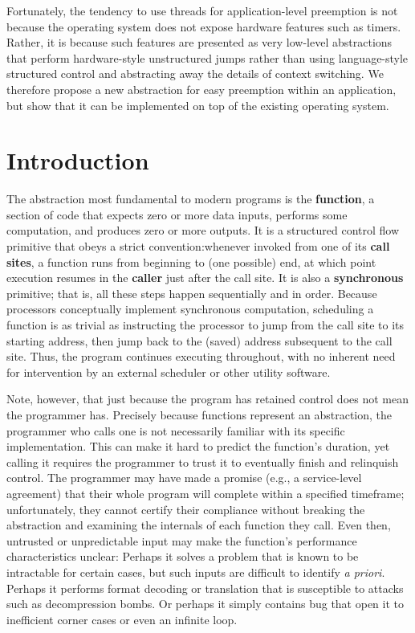 \documentclass[12pt,letterpaper,openright]{report}
\begin{document}
Fortunately, the tendency to use threads for application-level preemption is not
because the operating system does not expose hardware features such as timers.
Rather, it is because such features are presented as very low-level abstractions that
perform hardware-style unstructured jumps rather than using language-style structured
control and abstracting away the details of context switching.  We therefore propose
a new abstraction for easy preemption within an application, but show that it can be
implemented on top of the existing operating system.
\fi


\chapter{Introduction}

The abstraction most fundamental to modern programs is the \textbf{function}, a
section of code that expects zero or more data inputs, performs some computation, and
produces zero or more outputs.  It is a structured control flow primitive that obeys
a strict convention:\@ whenever invoked from one of its \textbf{call sites}, a
function runs from beginning to (one possible) end, at which point execution resumes
in the \textbf{caller} just after the call site.  It is also a \textbf{synchronous}
primitive; that is, all these steps happen sequentially and in order.  Because
processors conceptually implement synchronous computation, scheduling a function is
as trivial as instructing the processor to jump from the call site to its starting
address, then jump back to the (saved) address subsequent to the call site.  Thus,
the program continues executing throughout, with no inherent need for intervention by
an external scheduler or other utility software.

Note, however, that just because the program has retained control does not mean the
programmer has.  Precisely because functions represent an abstraction, the programmer
who calls one is not necessarily familiar with its specific implementation.  This can
make it hard to predict the function's duration, yet calling it requires the
programmer to trust it to eventually finish and relinquish control.  The programmer
may have made a promise (e.g., a service-level agreement) that their whole program
will complete within a specified timeframe; unfortunately, they cannot certify their
compliance without breaking the abstraction and examining the internals of each
function they call.  Even then, untrusted or unpredictable input may make the
function's performance characteristics unclear:  Perhaps it solves a problem that is
known to be intractable for certain cases, but such inputs are difficult to identify
\textit{a priori}.  Perhaps it performs format decoding or translation that is
susceptible to attacks such as decompression bombs.  Or perhaps it simply contains
bug that open it to inefficient corner cases or even an infinite loop.
\end{document}
